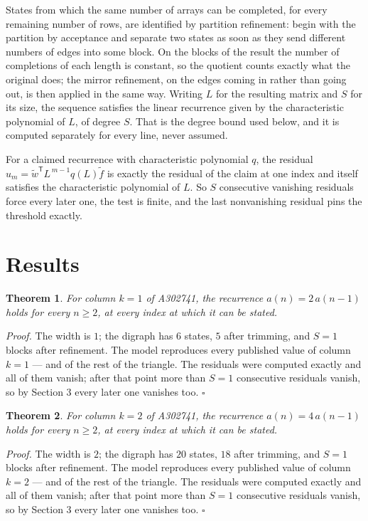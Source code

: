 \documentclass[11pt]{article}
\newtheorem{theorem}{Theorem}
\theoremstyle{definition}
\begin{document}
States from which the same number of arrays can be completed, for every remaining number of rows, are identified by partition refinement: begin with the partition by acceptance and separate two states as soon as they send different numbers of edges into some block. On the blocks of the result the number of completions of each length is constant, so the quotient counts exactly what the original does; the mirror refinement, on the edges coming in rather than going out, is then applied in the same way. Writing $L$ for the resulting matrix and $S$ for its size, the sequence satisfies the linear recurrence given by the characteristic polynomial of $L$, of degree $S$. That is the degree bound used below, and it is computed separately for every line, never assumed.

For a claimed recurrence with characteristic polynomial $q$, the residual $u_m = \tilde w^{\mathsf T}L^{\,m-1}q(L)\tilde f$ is exactly the residual of the claim at one index and itself satisfies the characteristic polynomial of $L$. So $S$ consecutive vanishing residuals force every later one, the test is finite, and the last nonvanishing residual pins the threshold exactly.

\section{Results}

\begin{theorem} For column $k = 1$ of A302741, the recurrence $a(n) = 2\,a(n-1)$ holds for every $n \ge 2$, at every index at which it can be stated.\end{theorem}

{\itshape Proof.} The width is $1$; the digraph has $6$ states, $5$ after trimming, and $S = 1$ blocks after refinement. The model reproduces every published value of column $k = 1$ --- and of the rest of the triangle. The residuals were computed exactly and all of them vanish; after that point more than $S = 1$ consecutive residuals vanish, so by Section 3 every later one vanishes too. $\square$

\begin{theorem} For column $k = 2$ of A302741, the recurrence $a(n) = 4\,a(n-1)$ holds for every $n \ge 2$, at every index at which it can be stated.\end{theorem}

{\itshape Proof.} The width is $2$; the digraph has $20$ states, $18$ after trimming, and $S = 1$ blocks after refinement. The model reproduces every published value of column $k = 2$ --- and of the rest of the triangle. The residuals were computed exactly and all of them vanish; after that point more than $S = 1$ consecutive residuals vanish, so by Section 3 every later one vanishes too. $\square$
\end{document}
